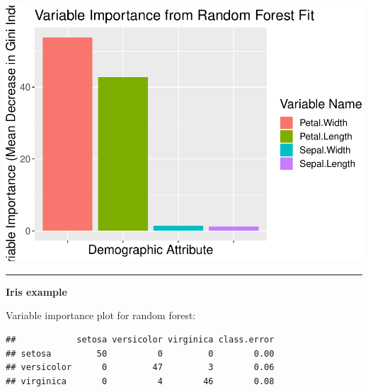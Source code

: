 \documentclass[]{article}
\newenvironment{Shaded}{\begin{snugshade}}{\end{snugshade}}
\newcommand{\CommentTok}[1]{\textcolor[rgb]{0.56,0.35,0.01}{\textit{#1}}}
\newcommand{\DataTypeTok}[1]{\textcolor[rgb]{0.13,0.29,0.53}{#1}}
\newcommand{\KeywordTok}[1]{\textcolor[rgb]{0.13,0.29,0.53}{\textbf{#1}}}
\newcommand{\NormalTok}[1]{#1}
\newcommand{\OperatorTok}[1]{\textcolor[rgb]{0.81,0.36,0.00}{\textbf{#1}}}
\newcommand{\StringTok}[1]{\textcolor[rgb]{0.31,0.60,0.02}{#1}}
\begin{document}
\includegraphics{8Trees_files/figure-latex/unnamed-chunk-36-1.pdf}

\begin{center}\rule{0.5\linewidth}{\linethickness}\end{center}

\textbf{Iris example}

Variable importance plot for random forest:

\begin{Shaded}
\end{Shaded}

\begin{verbatim}
##            setosa versicolor virginica class.error
## setosa         50          0         0        0.00
## versicolor      0         47         3        0.06
## virginica       0          4        46        0.08
\end{verbatim}
\end{document}
